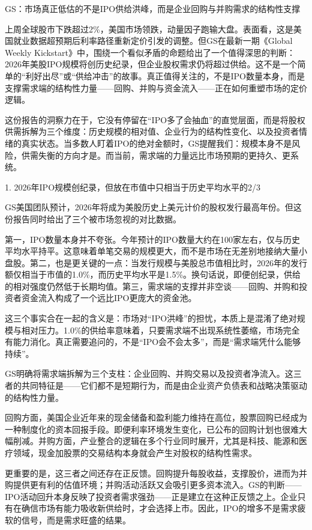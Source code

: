 \documentclass[11pt]{ctexart}
\begin{document}
GS：市场真正低估的不是IPO供给洪峰，而是企业回购与并购需求的结构性支撑

上周全球股市下跌超过2\%，美国市场领跌，动量因子跑输大盘。表面看，这是美国就业数据超预期后利率路径重新定价引发的调整。但GS在最新一期《Global Weekly Kickstart》中，围绕一个看似矛盾的命题给出了一个值得深思的判断：2026年美股IPO规模将创历史纪录，但企业股权需求仍将超过供给。这不是一个简单的“利好出尽”或“供给冲击”的故事。真正值得关注的，不是IPO数量本身，而是支撑需求端的结构性力量——回购、并购与资金流入——正在如何重塑市场的定价逻辑。

这份报告的洞察力在于，它没有停留在“IPO多了会抽血”的直觉层面，而是将股权供需拆解为三个维度：历史规模的相对值、企业行为的结构性变化、以及投资者情绪的真实状态。当多数人盯着IPO的绝对金额时，GS提醒我们：规模本身不是风险，供需失衡的方向才是。而当前，需求端的力量远比市场预期的更持久、更系统。

1. 2026年IPO规模创纪录，但放在市值中只相当于历史平均水平的2/3

GS美国团队预计，2026年将成为美股历史上美元计价的股权发行最高年份。但这份报告同时给出了三个被市场忽视的对比数据。

第一，IPO数量本身并不夸张。今年预计的IPO数量大约在100家左右，仅与历史平均水平持平。这意味着单笔交易的规模更大，而不是市场在无差别地接纳大量小盘股。第二，也是更关键的一点：当发行规模与美股总市值相比时，2026年的发行额仅相当于市值的1.0\%，而历史平均水平是1.5\%。换句话说，即便创纪录，供给的相对强度仍然低于长期均值。第三，需求端的支撑并非空谈——回购、并购和投资者资金流入构成了一个远比IPO更庞大的资金池。

这三个事实合在一起的含义是：市场对“IPO洪峰”的担忧，本质上是混淆了绝对规模与相对压力。1.0\%的供给率意味着，只要需求端不出现系统性萎缩，市场完全有能力消化。真正需要追问的，不是“IPO会不会太多”，而是“需求端凭什么能够持续”。

GS明确将需求端拆解为三个支柱：企业回购、并购交易以及投资者净流入。这三者的共同特征是——它们都不是短期行为，而是由企业资产负债表和战略决策驱动的结构性力量。

回购方面，美国企业近年来的现金储备和盈利能力维持在高位，股票回购已经成为一种制度化的资本回报手段。即便利率环境发生变化，已公布的回购计划也很难大幅削减。并购方面，产业整合的逻辑在多个行业同时展开，尤其是科技、能源和医疗领域，现金加股票的交易结构本身就会产生对股权的结构性需求。

更重要的是，这三者之间还存在正反馈。回购提升每股收益，支撑股价，进而为并购提供更有利的估值环境；并购活动活跃又会吸引更多资本流入。GS的判断——IPO活动回升本身反映了投资者需求强劲——正是建立在这种正反馈之上。企业只有在确信市场有能力吸收新供给时，才会选择上市。因此，IPO的增多不是需求疲软的信号，而是需求旺盛的结果。
\end{document}
